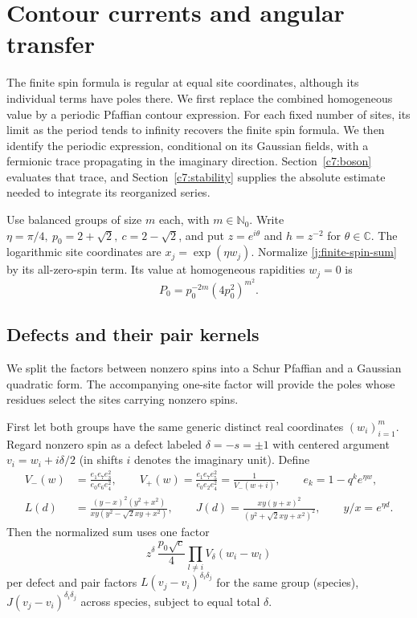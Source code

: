 \section{Contour currents and angular transfer}\label{c7:contour}

The finite spin formula is regular at equal site coordinates, although its individual terms have poles there. We first replace the combined homogeneous value by a periodic Pfaffian contour expression. For each fixed number of sites, its limit as the period tends to infinity recovers the finite spin formula. We then identify the periodic expression, conditional on its Gaussian fields, with a fermionic trace propagating in the imaginary direction. Section~\ref{c7:boson} evaluates that trace, and Section~\ref{c7:stability} supplies the absolute estimate needed to integrate its reorganized series.

Use balanced groups of size $m$ each, with $m\in\mathbb N_0$. Write $\eta=\pi/4,\ p_0=2+\sqrt2,\ c=2-\sqrt2$, and put $z=e^{i\theta}$ and $h=z^{-2}$ for $\theta\in\mathbb C$. The logarithmic site coordinates are $x_j=\exp(\eta w_j)$. Normalize \eqref{j:finite-spin-sum} by its all-zero-spin term. Its value at homogeneous rapidities $w_j=0$ is
\[
P_0=p_0^{-2m}(4p_0^2)^{m^2}.
\]

\subsection{Defects and their pair kernels}

We split the factors between nonzero spins into a Schur Pfaffian and a Gaussian quadratic form. The accompanying one-site factor will provide the poles whose residues select the sites carrying nonzero spins.

First let both groups have the same generic distinct real coordinates $(w_i)_{i=1}^m$. Regard nonzero spin as a defect labeled $\delta=-s=\pm1$ with centered argument $v_i=w_i+i\delta/2$ (in shifts $i$ denotes the imaginary unit). Define
\[
\begin{split}
 V_-(w)&=\frac{e_1 e_7 e_3^2}{e_0 e_6 e_4^2},\qquad
 V_+(w)=\frac{e_1 e_7 e_5^2}{e_0 e_2 e_4^2}=\frac1{V_-(w+i)},\qquad e_k=1-q^k e^{\eta w},\\
 L(d)&=\frac{(y-x)^2(y^2+x^2)}{xy(y^2-\sqrt2xy+x^2)},\qquad
 J(d)=\frac{xy(y+x)^2}{(y^2+\sqrt2xy+x^2)^2},\qquad y/x=e^{\eta d}.
 \end{split}
\]
Then the normalized sum uses one factor
\[
z^\delta\,\frac{p_0\sqrt c}{4}\prod_{l\ne i}V_\delta(w_i-w_l)
\]
per defect and pair factors $L(v_j-v_i)^{\delta_i\delta_j}$ for the same group (species), $J(v_j-v_i)^{\delta_i\delta_j}$ across species, subject to equal total $\delta$.

